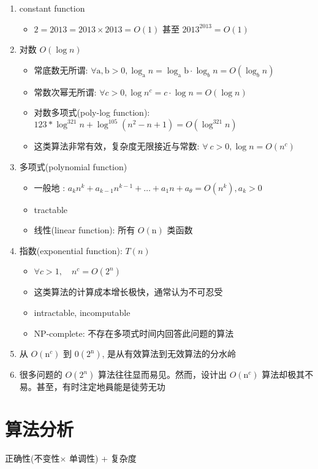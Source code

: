 \begin{enumerate}[label={(\arabic*)}]
\item constant function
\begin{itemize}
\item $2=2013=2013 \times 2013=O(1)$ 甚至 $2013^{2013}=O(1)$
\end{itemize}
\item 对数 $O(\log n)$
\begin{itemize}
\item 常底数无所谓: $\forall \mathrm{a}, \mathrm{b}>0, \log _{\mathrm{a}} n=\log _{\mathrm{a}} \mathrm{b} \cdot \log _{b} n=O\left(\log _{b} n\right)$
\item 常数次幂无所谓: $\forall c>0, \log n^{c}=c \cdot \log n=O(\log n)$
\item 对数多项式(poly-log function): $123 * \log^{321} n+\log ^{105}\left(n^{2}-n+1\right)=O\left(\log ^{321} n\right)$
\item 这类算法非常有效，复杂度无限接近与常数: $\forall\ c>0, \log n=O\left(n^{c}\right)$
\end{itemize}
\item 多项式(polynomial function)
\begin{itemize}
\item 一般地 : $a_{k} n^{k}+a_{k-1} n^{k-1}+\ldots+a_{1} n+a_{\theta}=O\left(n^{k}\right), a_{k}>0$
\item tractable
\item 线性(linear function): 所有 $O(\mathrm{n})$ 类函数
\end{itemize}
\item 指数(exponential function): $T(n)$
\begin{itemize}
\item $\forall c>1, \quad n^{c}=O\left(2^{n}\right)$
\item 这类算法的计算成本增长极快，通常认为不可忍受
\item intractable, incomputable
\item NP-complete: 不存在多项式时间内回答此问题的算法
\end{itemize}
\item 从 $O\left(\mathrm{n}^{c}\right)$ 到 $0\left(2^{\mathrm{n}}\right)$, 是从有效算法到无效算法的分水岭
\item 很多问题的 $O\left(2^{n}\right)$ 算法往往显而易见。然而，设计出 $O\left(\mathrm{n}^{c}\right)$ 算法却极其不易。甚至，有时注定地員能是徒劳无功
\end{enumerate}


\section{算法分析}
正确性(不变性$\times$ 单调性) + 复杂度

